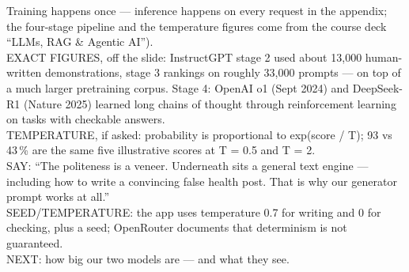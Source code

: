 \begin{frame}{Training happens once --- inference happens on every request}
{in the appendix; the four-stage pipeline and the temperature figures come from the course deck ``LLMs,
RAG \& Agentic AI'').\\
EXACT FIGURES, off the slide: InstructGPT stage 2 used about 13{,}000 human-written demonstrations,
stage 3 rankings on roughly 33{,}000 prompts --- on top of a much larger pretraining corpus.
Stage 4: OpenAI o1 (Sept 2024) and DeepSeek-R1 (Nature 2025) learned long chains of thought through
reinforcement learning on tasks with checkable answers.\\
TEMPERATURE, if asked: probability is proportional to exp(score / T); 93 vs 43\,\% are the same five
illustrative scores at T = 0.5 and T = 2.\\
SAY: ``The politeness is a veneer. Underneath sits a general text engine --- including how to write a
convincing false health post. That is why our generator prompt works at all.''\\
SEED/TEMPERATURE: the app uses temperature 0.7 for writing and 0 for checking, plus a seed;
OpenRouter documents that determinism is not guaranteed.\\
NEXT: how big our two models are --- and what they see.}
\end{frame}

